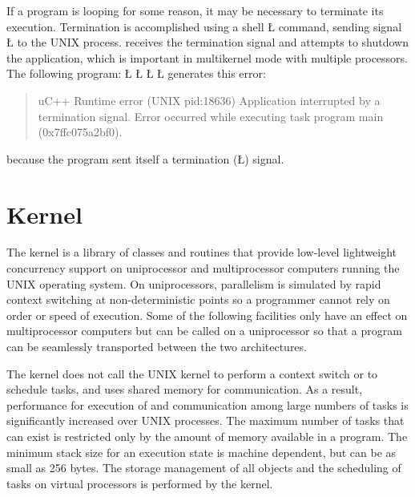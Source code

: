 \documentclass[openright,twoside]{report}
\begin{document}
If a \uC program is looping for some reason, it may be necessary to terminate its execution.
Termination is accomplished using a shell \LGinlinetrue\LGbegin\lgrinde\L{}\endlgrinde\LGend{} command, sending signal \LGinlinetrue\LGbegin\lgrinde\L{}\endlgrinde\LGend{} to the UNIX process.
\uC receives the termination signal and attempts to shutdown the application, which is important in multikernel mode with multiple processors.
The following program:
\LGinlinefalse\LGbegin\lgrinde
\L{}
\CE{}\L{}
\L{\LB{}}
\CE{}\L{\LB{\}}}
\endlgrinde\LGend
generates this error:
\begin{quote}
\BGfont
uC++ Runtime error (UNIX pid:18636) Application interrupted by a termination signal.
Error occurred while executing task program main (0x7ffc075a2bf0).
\end{quote}
because the \uC program sent itself a termination (\LGinlinetrue\LGbegin\lgrinde\L{}\endlgrinde\LGend{}) signal.


\chapter{\texorpdfstring{\uC Kernel}{uC++ Kernel}}
\label{c:uC++kernel}

The \uC kernel is a library of classes and routines that provide low-level lightweight concurrency support on uniprocessor and multiprocessor computers running the UNIX operating system.
On uniprocessors, parallelism is simulated by rapid context switching at non-deterministic points so a programmer cannot rely on order or speed of execution.
Some of the following facilities only have an effect on multiprocessor computers but can be called on a uniprocessor so that a program can be seamlessly transported between the two architectures.

The \uC kernel does not call the UNIX kernel to perform a context switch or to schedule tasks, and uses shared memory for communication.
As a result, performance for execution of and communication among large numbers of tasks is significantly increased over UNIX processes.
The maximum number of tasks that can exist is restricted only by the amount of memory available in a program.
The minimum stack size for an execution state is machine dependent, but can be as small as 256 bytes.
The storage management of all \uC objects and the scheduling of tasks on virtual processors is performed by the \uC kernel.
\end{document}
